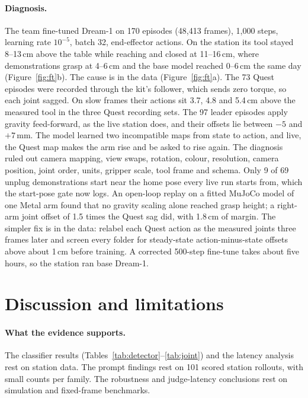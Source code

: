 \documentclass[10pt]{article}
\newcommand{\dream}{Dream-1}
\begin{document}
\paragraph{Diagnosis.} The team fine-tuned \dream{} on 170 episodes (48{,}413 frames), 1{,}000 steps, learning rate $10^{-5}$, batch 32,
end-effector actions. On the station its tool stayed 8--13\,cm above the table while reaching and closed at 11--16\,cm, where demonstrations
grasp at 4--6\,cm and the base model reached 0--6\,cm the same day (Figure~\ref{fig:ft}b). The cause is in the data (Figure~\ref{fig:ft}a). The
73 Quest episodes were recorded through the kit's follower, which sends zero torque, so each joint sagged. On slow frames their actions
sit 3.7, 4.8 and 5.4\,cm above the measured tool in the three Quest recording sets. The 97 leader episodes apply gravity feed-forward, as
the live station does, and their offsets lie between $-5$ and $+7$\,mm. The model
learned two incompatible maps from state to action, and live, the Quest map makes the arm rise and be asked to rise again. The diagnosis ruled out camera
mapping, view swaps, rotation, colour, resolution, camera position, joint order, units, gripper scale, tool frame and schema. Only 9 of 69
unplug demonstrations start near the home pose every live run starts from, which the start-pose gate now logs. An open-loop replay on a fitted
MuJoCo model of one Metal arm found that no gravity scaling alone reached grasp height; a right-arm joint offset of 1.5 times the Quest sag did,
with 1.8\,cm of margin. The simpler fix is in the data: relabel each Quest action as the measured joints three frames later and screen every
folder for steady-state action-minus-state offsets above about 1\,cm before training. A corrected 500-step fine-tune takes about five hours, so
the station ran base \dream{}.

\section{Discussion and limitations}
\label{sec:limits}

\paragraph{What the evidence supports.} The classifier results (Tables~\ref{tab:detector}--\ref{tab:joint}) and the latency analysis rest on
station data. The prompt findings rest on 101 scored station rollouts, with small counts per family. The robustness and judge-latency
conclusions rest on simulation and fixed-frame benchmarks.
\end{document}
